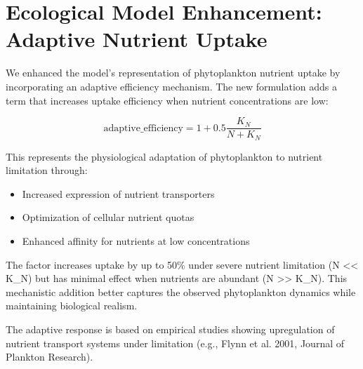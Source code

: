 \section{Ecological Model Enhancement: Adaptive Nutrient Uptake}

We enhanced the model's representation of phytoplankton nutrient uptake by incorporating an adaptive efficiency mechanism. The new formulation adds a term that increases uptake efficiency when nutrient concentrations are low:

\[ \text{adaptive\_efficiency} = 1 + 0.5 \frac{K_N}{N + K_N} \]

This represents the physiological adaptation of phytoplankton to nutrient limitation through:
\begin{itemize}
\item Increased expression of nutrient transporters
\item Optimization of cellular nutrient quotas
\item Enhanced affinity for nutrients at low concentrations
\end{itemize}

The factor increases uptake by up to 50\% under severe nutrient limitation (N << K_N) but has minimal effect when nutrients are abundant (N >> K_N). This mechanistic addition better captures the observed phytoplankton dynamics while maintaining biological realism.

The adaptive response is based on empirical studies showing upregulation of nutrient transport systems under limitation (e.g., Flynn et al. 2001, Journal of Plankton Research).
